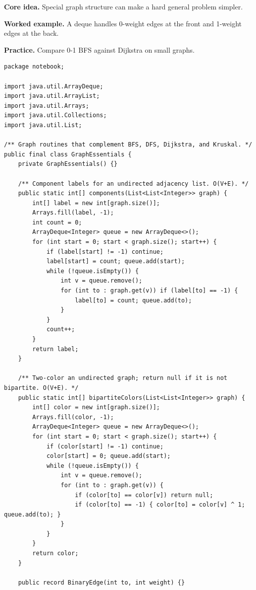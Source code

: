 \documentclass[10pt,letterpaper]{article}
\begin{document}
\noindent\textbf{Core idea.} Special graph structure can make a hard general problem simpler.\par
\noindent\textbf{Worked example.} A deque handles 0-weight edges at the front and 1-weight edges at the back.\par
\noindent\textbf{Practice.} Compare 0-1 BFS against Dijkstra on small graphs.\par
\begin{lstlisting}
package notebook;

import java.util.ArrayDeque;
import java.util.ArrayList;
import java.util.Arrays;
import java.util.Collections;
import java.util.List;

/** Graph routines that complement BFS, DFS, Dijkstra, and Kruskal. */
public final class GraphEssentials {
    private GraphEssentials() {}

    /** Component labels for an undirected adjacency list. O(V+E). */
    public static int[] components(List<List<Integer>> graph) {
        int[] label = new int[graph.size()];
        Arrays.fill(label, -1);
        int count = 0;
        ArrayDeque<Integer> queue = new ArrayDeque<>();
        for (int start = 0; start < graph.size(); start++) {
            if (label[start] != -1) continue;
            label[start] = count; queue.add(start);
            while (!queue.isEmpty()) {
                int v = queue.remove();
                for (int to : graph.get(v)) if (label[to] == -1) {
                    label[to] = count; queue.add(to);
                }
            }
            count++;
        }
        return label;
    }

    /** Two-color an undirected graph; return null if it is not bipartite. O(V+E). */
    public static int[] bipartiteColors(List<List<Integer>> graph) {
        int[] color = new int[graph.size()];
        Arrays.fill(color, -1);
        ArrayDeque<Integer> queue = new ArrayDeque<>();
        for (int start = 0; start < graph.size(); start++) {
            if (color[start] != -1) continue;
            color[start] = 0; queue.add(start);
            while (!queue.isEmpty()) {
                int v = queue.remove();
                for (int to : graph.get(v)) {
                    if (color[to] == color[v]) return null;
                    if (color[to] == -1) { color[to] = color[v] ^ 1; queue.add(to); }
                }
            }
        }
        return color;
    }

    public record BinaryEdge(int to, int weight) {}


\end{lstlisting}
\end{document}
